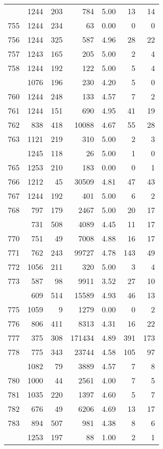 \documentclass[
]{article}
\begin{document}
\begin{table}
\begin{tabular}[t]{lrrrrrr}
\addlinespace
754 & 1244 & 203 & 784 & 5.00 & 13 & 14\\
755 & 1244 & 234 & 63 & 0.00 & 0 & 0\\
756 & 1244 & 325 & 587 & 4.96 & 28 & 22\\
757 & 1243 & 165 & 205 & 5.00 & 2 & 4\\
758 & 1244 & 192 & 122 & 5.00 & 5 & 4\\
\addlinespace
759 & 1076 & 196 & 230 & 4.20 & 5 & 0\\
760 & 1244 & 248 & 133 & 4.57 & 7 & 2\\
761 & 1244 & 151 & 690 & 4.95 & 41 & 19\\
762 & 838 & 418 & 10088 & 4.67 & 55 & 28\\
763 & 1121 & 219 & 310 & 5.00 & 2 & 3\\
\addlinespace
764 & 1245 & 118 & 26 & 5.00 & 1 & 0\\
765 & 1253 & 210 & 183 & 0.00 & 0 & 1\\
766 & 1212 & 45 & 30509 & 4.81 & 47 & 43\\
767 & 1244 & 192 & 401 & 5.00 & 6 & 2\\
768 & 797 & 179 & 2467 & 5.00 & 20 & 17\\
\addlinespace
769 & 731 & 508 & 4089 & 4.45 & 11 & 17\\
770 & 751 & 49 & 7008 & 4.88 & 16 & 17\\
771 & 762 & 243 & 99727 & 4.78 & 143 & 49\\
772 & 1056 & 211 & 320 & 5.00 & 3 & 4\\
773 & 587 & 98 & 9911 & 3.52 & 27 & 10\\
\addlinespace
774 & 609 & 514 & 15589 & 4.93 & 46 & 13\\
775 & 1059 & 9 & 1279 & 0.00 & 0 & 2\\
776 & 806 & 411 & 8313 & 4.31 & 16 & 22\\
777 & 375 & 308 & 171434 & 4.89 & 391 & 173\\
778 & 775 & 343 & 23744 & 4.58 & 105 & 97\\
\addlinespace
779 & 1082 & 79 & 3889 & 4.57 & 7 & 8\\
780 & 1000 & 44 & 2561 & 4.00 & 7 & 5\\
781 & 1035 & 220 & 1397 & 4.60 & 5 & 7\\
782 & 676 & 49 & 6206 & 4.69 & 13 & 17\\
783 & 894 & 507 & 981 & 4.38 & 8 & 6\\
\addlinespace
784 & 1253 & 197 & 88 & 1.00 & 2 & 1\\

\end{tabular}
\end{table}
\end{document}
